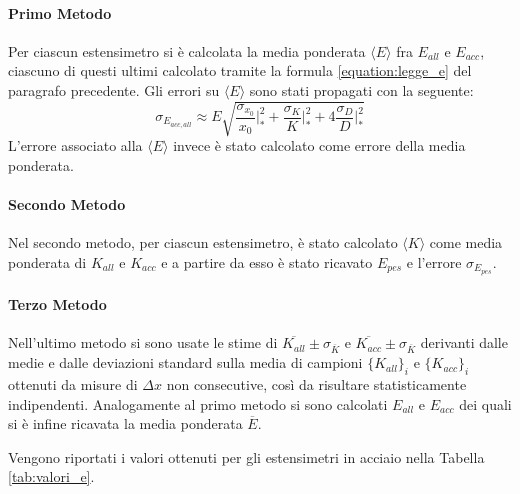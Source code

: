 \documentclass[a4paper,11pt,oneside]{article}
\begin{document}
\paragraph{Primo Metodo}
Per ciascun estensimetro si è calcolata la media ponderata $\langle E \rangle $ fra $E_{all}$ e $E_{acc}$, ciascuno di questi ultimi calcolato tramite la formula \ref{equation:legge_e} del paragrafo precedente. Gli errori su $\langle E \rangle$ sono stati propagati con la seguente:
\begin{equation}
    \label{eq:propagazione_particolare}
    \sigma_{E_{acc, all}} \approx E\sqrt{\frac{\sigma_{x_{0}}}{x_{0}}\Big|_{\ast}^2+\frac{\sigma_{K}}{K}\Big|_{\ast}^2+4\frac{\sigma_{D}}{D}\Big|_{\ast}^2}
\end{equation}
L'errore associato alla $\langle E \rangle $ invece è stato calcolato come errore della media ponderata.

\paragraph{Secondo Metodo}
Nel secondo metodo, per ciascun estensimetro, è stato calcolato $\langle K \rangle $ come media ponderata di $K_{all}$ e $K_{acc}$ e a partire da esso è stato ricavato $E_{pes}$ e l'errore $\sigma_{E_{pes}}$.

\paragraph{Terzo Metodo}
Nell'ultimo metodo si sono usate le stime di $\overline{K_{all}} \pm \sigma_{\overline{K}}$ e $\overline{K_{acc}} \pm \sigma_{\overline{K}}$ derivanti dalle medie e dalle deviazioni standard sulla media di campioni $\{ K_{all} \}_i$ e $\{ K_{acc}\}_i $ ottenuti da misure di $\Delta x$ non consecutive, così da risultare statisticamente indipendenti. Analogamente al primo metodo si sono calcolati $E_{all}$ e $E_{acc}$ dei quali si è infine ricavata la media ponderata $\overline{E}$.

Vengono riportati i valori ottenuti per gli estensimetri in acciaio nella Tabella \ref{tab:valori_e}.\\
\end{document}
